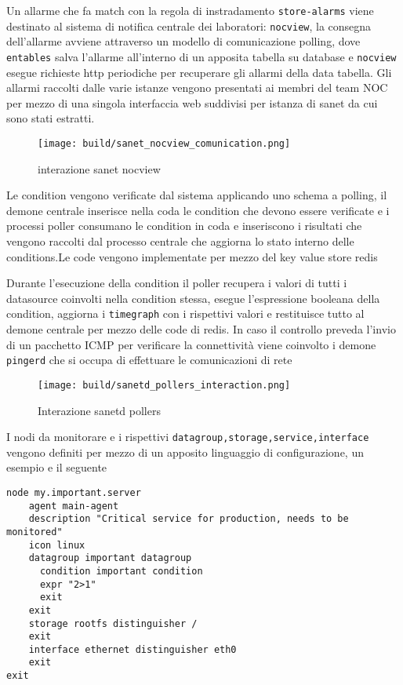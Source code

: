 Un allarme che fa match con la regola di instradamento \verb|store-alarms| viene destinato al sistema di notifica centrale dei laboratori: \verb|nocview|, la consegna dell'allarme avviene attraverso un modello di comunicazione polling, dove \verb|entables| salva l'allarme all'interno di un apposita tabella su database e \verb|nocview| esegue richieste http periodiche per recuperare gli allarmi della data tabella.
Gli allarmi raccolti dalle varie istanze vengono presentati ai membri del team NOC per mezzo di una singola interfaccia web suddivisi per istanza di sanet da cui sono stati estratti.

\begin{figure}[H]
    \centering
    \texttt{[image: build/sanet\_nocview\_comunication.png]}
    \caption{interazione sanet nocview}
    \label{fig:enter-label}
\end{figure}

Le condition vengono verificate dal sistema applicando uno schema a polling, il demone centrale inserisce nella coda le condition che devono essere verificate e i processi poller consumano le condition in coda e inseriscono i risultati che vengono raccolti dal processo centrale che aggiorna lo stato interno delle conditions.Le code vengono implementate per mezzo del key value store redis

Durante l'esecuzione della condition il poller recupera i valori di tutti i datasource coinvolti nella condition stessa, esegue l'espressione booleana della condition, aggiorna i \verb|timegraph| con i rispettivi valori e restituisce tutto al demone centrale per mezzo delle code di redis. In caso il controllo preveda l'invio di un pacchetto ICMP per verificare la connettività viene coinvolto i demone \verb|pingerd| che si occupa di effettuare le comunicazioni di rete

\begin{figure}[H]
    \centering
    \texttt{[image: build/sanetd\_pollers\_interaction.png]}
    \caption{Interazione sanetd pollers}
    \label{fig:enter-label}
\end{figure}

I nodi da monitorare e i rispettivi \verb|datagroup,storage,service,interface| vengono definiti per mezzo di un apposito linguaggio di configurazione, un esempio e il seguente

\begin{lstlisting}
node my.important.server
    agent main-agent
    description "Critical service for production, needs to be monitored"
    icon linux
    datagroup important datagroup
      condition important condition
      expr "2>1"
      exit
    exit
    storage rootfs distinguisher /
    exit
    interface ethernet distinguisher eth0
    exit
exit
\end{lstlisting}

